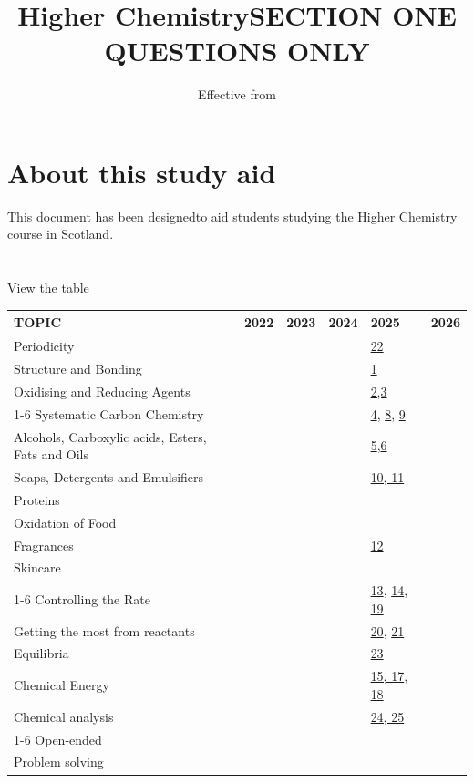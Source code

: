 \documentclass[12pt,a4paper]{article}
\begin{document}
\hyperref[contents]{}
\title{Higher Chemistry}
\author{Effective from}
\maketitle

\section{About this study aid}
This document has been designedto aid students studying the Higher Chemistry course in Scotland.
\section{}
\hyperlink{page.2}{View the table}

\newpage
\title{SECTION ONE QUESTIONS ONLY}
\maketitle
\begin{table}[ht]
\begin{tabular}{@{}llllll@{}}
\toprule
TOPIC & 2022 & 2023 & 2024 & 2025 & 2026 \\ \midrule
Periodicity &  &  &  & \hyperlink{twentyfive.9}{22} &  \\
Structure and Bonding &  &  &  & \hyperlink{twentyfive.2}{1} &  \\
Oxidising and Reducing Agents &  &  &  & \hyperlink{twentyfive.2}{2,3}&  \\ \cmidrule(r){1-6}
Systematic Carbon Chemistry &  &  &  & \hyperlink{twentyfive.1}{4}, \hyperlink{twentyfive.3}{8}, \hyperlink{twentyfive.4}{9} &  \\
Alcohols, Carboxylic acids, Esters, Fats and Oils &  &  &  & \hyperlink{twentyfive.3}{5},\hyperlink{twentyfive.3}{6} &  \\
Soaps, Detergents and Emulsifiers &  &  &  & \hyperlink{twentyfive.4}{10, 11} &  \\
Proteins &  &  &  &  &  \\
Oxidation of Food &  &  &  &  &  \\
Fragrances &  &  &  & \hyperlink{twentyfive.5}{12} &  \\
Skincare &  &  &  &  &  \\ \cmidrule{1-6}
Controlling the Rate &  &  &  & \hyperlink{twentyfive.5}{13}, \hyperlink{twentyfive.6}{14}, \hyperlink{twentyfive.8}{19} &  \\
Getting the most from reactants &  &  &  & \hyperlink{twentyfive.8}{20}, \hyperlink{twentyfive.9}{21} &  \\
Equilibria &  &  &  & \hyperlink{twentyfive.9}{23} &  \\
Chemical Energy &  &  &  & \hyperlink{twentyfive.7}{15, 17}, \hyperlink{twentyfive.8}{18} &  \\
Chemical analysis &  &  &  & \hyperlink{twentyfive.10}{24, 25} &  \\ \cmidrule{1-6}
Open-ended &  &  &  &  &  \\
Problem solving &  &  &  &  &  \\ \bottomrule

\end{tabular}
\end{table}

\newpage
\pagestyle{fancy}
\fancyhf{}

\end{document}
